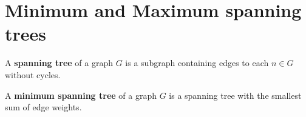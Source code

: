 \newpage 
\section{Minimum and Maximum spanning trees}

\begin{Def}

    A \textbf{spanning tree} of a graph $G$ is a subgraph containing edges to each $n\in G$ without cycles.
\end{Def}

\begin{Def}

    A \textbf{minimum spanning tree} of a graph $G$ is a spanning tree with the smallest sum of edge weights.
\end{Def}

